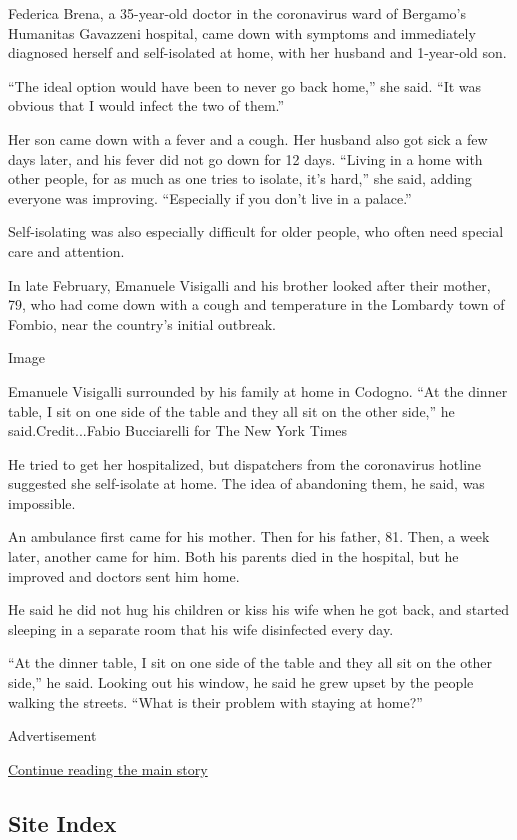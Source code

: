 Federica Brena, a 35-year-old doctor in the coronavirus ward of
Bergamo's Humanitas Gavazzeni hospital, came down with symptoms and
immediately diagnosed herself and self-isolated at home, with her
husband and 1-year-old son.

``The ideal option would have been to never go back home,'' she said.
``It was obvious that I would infect the two of them.''

Her son came down with a fever and a cough. Her husband also got sick a
few days later, and his fever did not go down for 12 days. ``Living in a
home with other people, for as much as one tries to isolate, it's
hard,'' she said, adding everyone was improving. ``Especially if you
don't live in a palace.''

Self-isolating was also especially difficult for older people, who often
need special care and attention.

In late February, Emanuele Visigalli and his brother looked after their
mother, 79, who had come down with a cough and temperature in the
Lombardy town of Fombio, near the country's initial outbreak.

Image

Emanuele Visigalli surrounded by his family at home in Codogno. ``At the
dinner table, I sit on one side of the table and they all sit on the
other side,'' he said.Credit...Fabio Bucciarelli for The New York Times

He tried to get her hospitalized, but dispatchers from the coronavirus
hotline suggested she self-isolate at home. The idea of abandoning them,
he said, was impossible.

An ambulance first came for his mother. Then for his father, 81. Then, a
week later, another came for him. Both his parents died in the hospital,
but he improved and doctors sent him home.

He said he did not hug his children or kiss his wife when he got back,
and started sleeping in a separate room that his wife disinfected every
day.

``At the dinner table, I sit on one side of the table and they all sit
on the other side,'' he said. Looking out his window, he said he grew
upset by the people walking the streets. ``What is their problem with
staying at home?''

Advertisement

\protect\hyperlink{after-bottom}{Continue reading the main story}

\hypertarget{site-index}{%
\subsection{Site Index}\label{site-index}}

